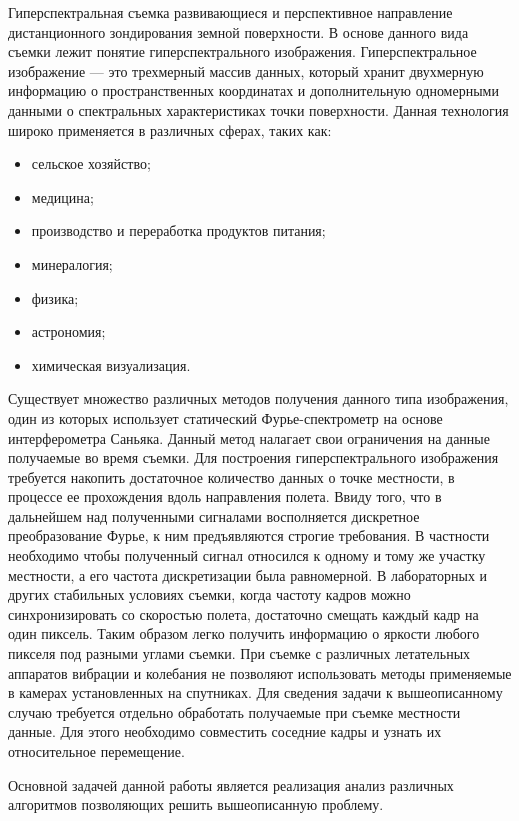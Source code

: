 \label{sec:intro}
Гиперспектральная съемка развивающиеся и перспективное направление дистанционного зондирования земной поверхности. В основе данного вида съемки лежит понятие гиперспектрального изображения. Гиперспектральное изображение --- это трехмерный массив данных, который хранит двухмерную информацию о пространственных координатах и дополнительную одномерными данными о спектральных характеристиках точки поверхности. Данная технология широко применяется в различных сферах, таких как:
\begin{itemize}
    \item сельское хозяйство;
    \item медицина;
    \item производство и переработка продуктов питания;
    \item минералогия;
    \item физика;
    \item астрономия;
    \item химическая визуализация.
\end{itemize}

Существует множество различных методов получения данного типа изображения, один из которых использует статический Фурье-спектрометр на основе интерферометра Саньяка. Данный метод налагает свои ограничения на данные получаемые во время съемки. Для построения гиперспектрального изображения требуется накопить достаточное количество данных о точке местности, в процессе ее прохождения вдоль направления полета. Ввиду того, что в дальнейшем над полученными сигналами восполняется дискретное преобразование Фурье, к ним предъявляются строгие требования. В частности необходимо чтобы полученный сигнал относился к одному и тому же участку местности, а его частота дискретизации была равномерной. В лабораторных и других стабильных условиях съемки, когда частоту кадров можно синхронизировать со скоростью полета, достаточно смещать каждый кадр на один пиксель. Таким образом легко получить информацию о яркости любого пикселя под разными углами съемки. При съемке с различных летательных аппаратов вибрации и колебания не позволяют использовать методы применяемые в камерах установленных на спутниках. Для сведения задачи к вышеописанному случаю требуется отдельно обработать получаемые при съемке местности данные. Для этого необходимо совместить соседние кадры и узнать их относительное перемещение. 

Основной задачей данной работы является реализация анализ различных алгоритмов позволяющих решить вышеописанную проблему.

